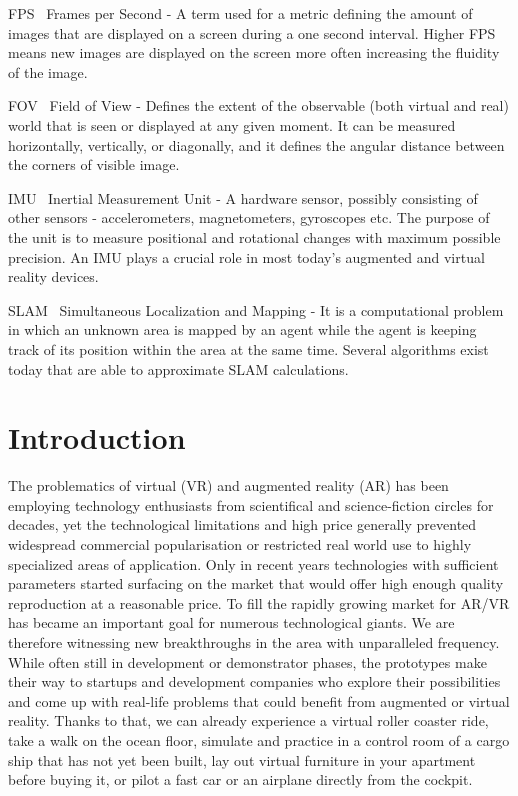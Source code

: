 \documentclass[12pt, a4paper]{article}
\newenvironment{definitions}
{\begin{description}[style=nextline]}
{\end{description}}
\begin{document}
\begin{definitions}
	\item[FPS~] Frames per Second - A term used for a metric defining the amount of images that are displayed on a screen during a one second interval. Higher FPS means new images are displayed on the screen more often increasing the fluidity of the image.
	\item[FOV~] Field of View - Defines the extent of the observable (both virtual and real) world that is seen or displayed at any given moment. It can be measured horizontally, vertically, or diagonally, and it defines the angular distance between the corners of visible image.
	\item[IMU~] Inertial Measurement Unit - A hardware sensor, possibly consisting of other sensors - accelerometers, magnetometers, gyroscopes etc. The purpose of the unit is to measure positional and rotational changes with maximum possible precision. An IMU plays a crucial role in most today’s augmented and virtual reality devices.
	\item[SLAM~] Simultaneous Localization and Mapping - It is a computational problem in which an unknown area is mapped by an agent while the agent is keeping track of its position within the area at the same time. Several algorithms exist today that are able to approximate SLAM calculations.

\end{definitions}

\section{Introduction}

The problematics of virtual (VR) and augmented reality (AR) has been employing technology enthusiasts from scientifical and science-fiction circles for decades, yet the technological limitations and high price generally prevented widespread commercial popularisation or restricted real world use to highly specialized areas of application. Only in recent years technologies with sufficient parameters started surfacing on the market that would offer high enough quality reproduction at a reasonable price. To fill the rapidly growing market for AR/VR has became an important goal for numerous technological giants. We are therefore witnessing new breakthroughs in the area with unparalleled frequency. While often still in development or demonstrator phases, the prototypes make their way to startups and development companies who explore their possibilities and come up with real-life problems that could benefit from augmented or virtual reality. Thanks to that, we can already experience a virtual roller coaster ride, take a walk on the ocean floor, simulate and practice in a control room of a cargo ship that has not yet been built, lay out virtual furniture in your apartment before buying it, or pilot a fast car or an airplane directly from the cockpit.
\end{document}

